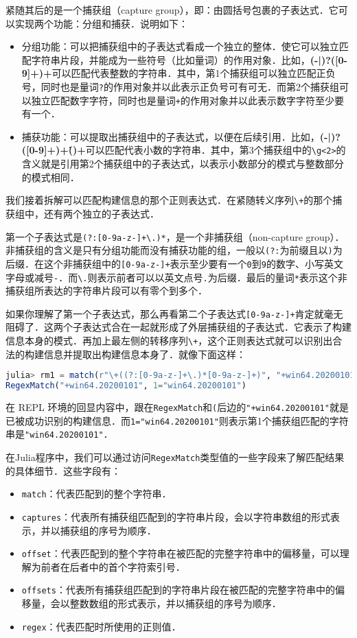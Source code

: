紧随其后的是一个捕获组（capture group），即：由圆括号包裹的子表达式．它可以实现两个功能：分组和捕获．说明如下：

\begin{itemize}
\item 分组功能：可以把捕获组中的子表达式看成一个独立的整体．使它可以独立匹配字符串片段，并能成为一些符号（比如量词）的作用对象．比如，\textbf{(-|\+)?([0-9]+)+}可以匹配代表整数的字符串．其中，第1个捕获组可以独立匹配正负号，同时也是量词\verb|?|的作用对象并以此表示正负号可有可无．而第2个捕获组可以独立匹配数字字符，同时也是量词\verb|+|的作用对象并以此表示数字字符至少要有一个．
\item 捕获功能：可以提取出捕获组中的子表达式，以便在后续引用．比如，\textbf{(-|\+)?([0-9]+)+\.()+}可以匹配代表小数的字符串．其中，第3个捕获组中的\verb|\g<2>|的含义就是引用第2个捕获组中的子表达式，以表示小数部分的模式与整数部分的模式相同．
\end{itemize}

我们接着拆解可以匹配构建信息的那个正则表达式．在紧随转义序列\verb|\+|的那个捕获组中，还有两个独立的子表达式．

第一个子表达式是\verb|(?:[0-9a-z-]+\.)*|，是一个非捕获组（non-capture group）．非捕获组的含义是只有分组功能而没有捕获功能的组，一般以\verb|(?:|为前缀且以\verb|)|为后缀．在这个非捕获组中的\verb|[0-9a-z-]+|表示至少要有一个\verb|0|到\verb|9|的数字、小写英文字母或减号\verb|-|．而\verb|\.|则表示前者可以以英文点号\verb|.|为后缀．最后的量词\verb|*|表示这个非捕获组所表达的字符串片段可以有零个到多个．

如果你理解了第一个子表达式，那么再看第二个子表达式\verb|[0-9a-z-]+|肯定就毫无阻碍了．这两个子表达式合在一起就形成了外层捕获组的子表达式．它表示了构建信息本身的模式．再加上最左侧的转移序列\verb|\+|，这个正则表达式就可以识别出合法的构建信息并提取出构建信息本身了．就像下面这样：
\begin{lstlisting}[language=julia]
julia> rm1 = match(r"\+((?:[0-9a-z-]+\.)*[0-9a-z-]+)", "+win64.20200101")
RegexMatch("+win64.20200101", 1="win64.20200101")
\end{lstlisting}

在 REPL 环境的回显内容中，跟在\verb|RegexMatch|和\verb|(|后边的\verb|"+win64.20200101"|就是已被成功识别的构建信息．而\verb|1="win64.20200101"|则表示第1个捕获组匹配的字符串是\verb|"win64.20200101"|．

在Julia程序中，我们可以通过访问\verb|RegexMatch|类型值的一些字段来了解匹配结果的具体细节．这些字段有：
\begin{itemize}
\item \verb|match|：代表匹配到的整个字符串．
\item \verb|captures|：代表所有捕获组匹配到的字符串片段，会以字符串数组的形式表示，并以捕获组的序号为顺序．
\item \verb|offset|：代表匹配到的整个字符串在被匹配的完整字符串中的偏移量，可以理解为前者在后者中的首个字符索引号．
\item \verb|offsets|：代表所有捕获组匹配到的字符串片段在被匹配的完整字符串中的偏移量，会以整数数组的形式表示，并以捕获组的序号为顺序．
\item \verb|regex|：代表匹配时所使用的正则值．
\end{itemize}

